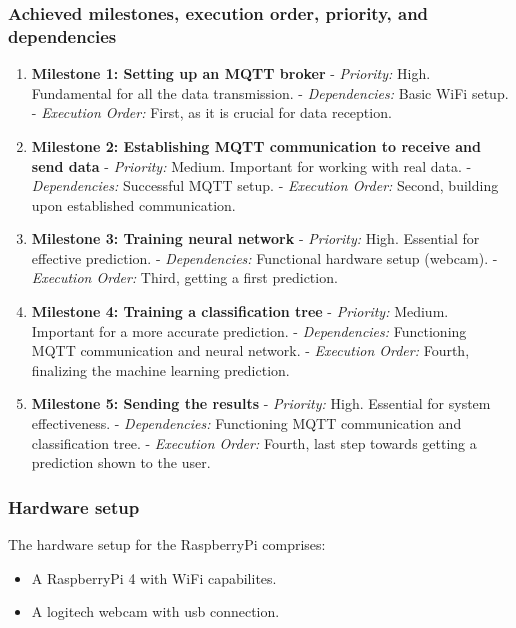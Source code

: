 \documentclass{article}
\begin{document}
\subsubsection{Achieved milestones, execution order, priority, and dependencies}
\begin{enumerate}
    \item \textbf{Milestone 1: Setting up an MQTT broker}
       - \textit{Priority:} High. Fundamental for all the data transmission.
       - \textit{Dependencies:} Basic WiFi setup.
       - \textit{Execution Order:} First, as it is crucial for data reception.

    \item \textbf{Milestone 2: Establishing MQTT communication to receive and send data}
       - \textit{Priority:} Medium. Important for working with real data.
       - \textit{Dependencies:} Successful MQTT setup.
       - \textit{Execution Order:} Second, building upon established communication.

    \item \textbf{Milestone 3: Training neural network}
       - \textit{Priority:} High. Essential for effective prediction.
       - \textit{Dependencies:} Functional hardware setup (webcam).
       - \textit{Execution Order:} Third, getting a first prediction.

    \item \textbf{Milestone 4: Training a classification tree}
       - \textit{Priority:} Medium. Important for a more accurate prediction.
       - \textit{Dependencies:} Functioning MQTT communication and neural network.
       - \textit{Execution Order:} Fourth, finalizing the machine learning prediction.

    \item \textbf{Milestone 5: Sending the results}
       - \textit{Priority:} High. Essential for system effectiveness.
       - \textit{Dependencies:} Functioning MQTT communication and classification tree.
       - \textit{Execution Order:} Fourth, last step towards getting a prediction shown to the user.
\end{enumerate}

\subsubsection{Hardware setup}
The hardware setup for the RaspberryPi comprises:
\begin{itemize}
    \item A RaspberryPi 4 with WiFi capabilites.
    \item A logitech webcam with usb connection.
\end{itemize}
\end{document}
